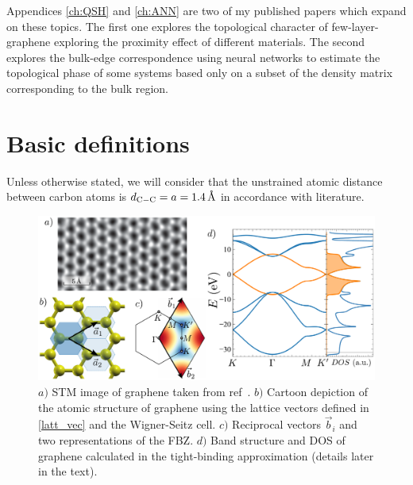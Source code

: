 Appendices \ref{ch:QSH} and \ref{ch:ANN} are two of my published papers which expand on these topics. The first one explores the topological character of few-layer-graphene exploring the proximity effect of different materials. The second explores the bulk-edge correspondence\cite{Hasan2010} using neural networks to estimate the topological phase of some systems based only on a subset of the density matrix corresponding to the bulk region.



\section{Basic definitions}
Unless otherwise stated, we will consider that the unstrained atomic distance between carbon atoms is $d_{\ce{C}-\ce{C}}=a=\SI{1.4}{\angstrom}$ in accordance with literature\cite{KatsnelsonBook, Cooper2012, Ishigami2007}. %

\begin{figure}[!ht]
\centering
\includegraphics{graphene/figures/graphene_summary.pdf}
\vspace{-5pt}
\caption{$a)$ STM image of graphene taken from ref~\cite{Huang2011}. $b)$ Cartoon depiction of the atomic structure of graphene using the lattice vectors defined in \eqref{latt_vec} and the Wigner-Seitz cell. $c)$ Reciprocal vectors $\vec{b}_i$ and two representations of the FBZ. $d)$ Band structure and DOS of graphene calculated in the tight-binding approximation (details later in the text).}
\label{graphene_summary}
\end{figure}

